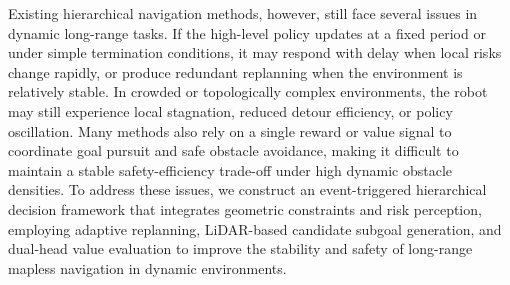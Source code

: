 Existing hierarchical navigation methods, however, still face several issues in dynamic long-range tasks. If the high-level policy updates at a fixed period or under simple termination conditions, it may respond with delay when local risks change rapidly, or produce redundant replanning when the environment is relatively stable. In crowded or topologically complex environments, the robot may still experience local stagnation, reduced detour efficiency, or policy oscillation. Many methods also rely on a single reward or value signal to coordinate goal pursuit and safe obstacle avoidance, making it difficult to maintain a stable safety-efficiency trade-off under high dynamic obstacle densities. To address these issues, we construct an event-triggered hierarchical decision framework that integrates geometric constraints and risk perception, employing adaptive replanning, LiDAR-based candidate subgoal generation, and dual-head value evaluation to improve the stability and safety of long-range mapless navigation in dynamic environments.


